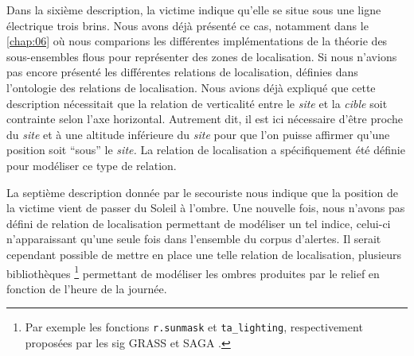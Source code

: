 Dans la sixième description, la victime indique qu'elle se situe sous
une ligne électrique trois brins. Nous avons déjà présenté ce cas,
notamment dans le \autoref{chap:06} où nous comparions les différentes
implémentations de la théorie des sous-ensembles flous pour
représenter des zones de localisation. Si nous n'avions pas encore
présenté les différentes relations de localisation, définies dans
l'ontologie des relations de localisation. Nous avions déjà expliqué
que cette description nécessitait que la relation de verticalité entre
le \emph{site} et la \emph{cible} soit contrainte selon l'axe
horizontal. Autrement dit, il est ici nécessaire d'être proche du
\emph{site} et à une altitude inférieure du \emph{site} pour que l'on
puisse affirmer qu'une position soit \enquote{sous} le \emph{site.}
La relation de localisation  a spécifiquement
été définie pour modéliser ce type de relation.

La septième description donnée par le secouriste nous indique que la
position de la victime vient de passer du Soleil à l'ombre. Une
nouvelle fois, nous n'avons pas défini de relation de localisation
permettant de modéliser un tel indice, celui-ci n'apparaissant qu'une
seule fois dans l'ensemble du corpus d'alertes. Il serait cependant
possible de mettre en place une telle relation de localisation,
plusieurs bibliothèques \footnote{Par exemple les fonctions
  \texttt{r.sunmask} et \texttt{ta\_lighting}, respectivement
  proposées par les \ac{sig} GRASS \autocite{GDT2020} et SAGA
  \autocite{Conrad2015}.} permettant de modéliser les ombres produites
par le relief en fonction de l'heure de la journée.

